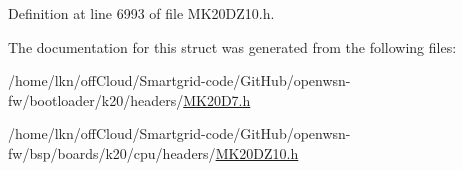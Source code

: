 Definition at line 6993 of file M\+K20\+D\+Z10.\+h.



The documentation for this struct was generated from the following files\+:\begin{DoxyCompactItemize}
\item 
/home/lkn/off\+Cloud/\+Smartgrid-\/code/\+Git\+Hub/openwsn-\/fw/bootloader/k20/headers/\hyperlink{bootloader_2k20_2headers_2_m_k20_d7_8h}{M\+K20\+D7.\+h}\item 
/home/lkn/off\+Cloud/\+Smartgrid-\/code/\+Git\+Hub/openwsn-\/fw/bsp/boards/k20/cpu/headers/\hyperlink{_m_k20_d_z10_8h}{M\+K20\+D\+Z10.\+h}\end{DoxyCompactItemize}
